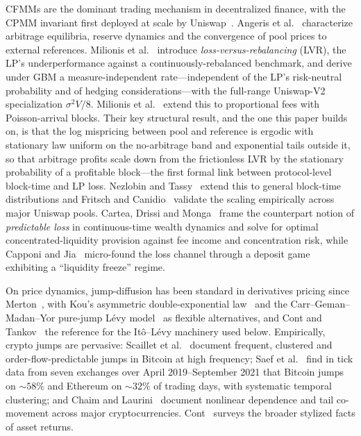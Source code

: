 \documentclass[runningheads]{llncs}
\newcommand{\1}{\mathbf{1}}
\begin{document}
CFMMs are the dominant trading mechanism in decentralized finance, with the CPMM invariant first deployed at scale by Uniswap~\cite{adams2021uniswap}. Angeris et al.~\cite{angeris2020improved} characterize arbitrage equilibria, reserve dynamics and the convergence of pool prices to external references. Milionis et al.~\cite{milionis2022automated} introduce \emph{loss-versus-rebalancing} (LVR), the LP's underperformance against a continuously-rebalanced benchmark, and derive under GBM a measure-independent rate---independent of the LP's risk-neutral probability and of hedging considerations---with the full-range Uniswap-V2 specialization $\sigma^2 V/8$. Milionis et al.~\cite{milionis2023automated} extend this to proportional fees with Poisson-arrival blocks. Their key structural result, and the one this paper builds on, is that the log mispricing between pool and reference is ergodic with stationary law uniform on the no-arbitrage band and exponential tails outside it, so that arbitrage profits scale down from the frictionless LVR by the stationary probability of a profitable block---the first formal link between protocol-level block-time and LP loss. Nezlobin and Tassy~\cite{nezlobin2025lvr} extend this to general block-time distributions and Fritsch and Canidio~\cite{fritsch2024measuring} validate the scaling empirically across major Uniswap pools. Cartea, Drissi and Monga~\cite{cartea2023predictable} frame the counterpart notion of \emph{predictable loss} in continuous-time wealth dynamics and solve for optimal concentrated-liquidity provision against fee income and concentration risk, while Capponi and Jia~\cite{capponi2024price} micro-found the loss channel through a deposit game exhibiting a ``liquidity freeze'' regime.

On price dynamics, jump-diffusion has been standard in derivatives pricing since Merton~\cite{merton1976option}, with Kou's asymmetric double-exponential law~\cite{kou2002jump} and the Carr--Geman--Madan--Yor pure-jump L\'evy model~\cite{carr2002fine} as flexible alternatives, and Cont and Tankov~\cite{cont2003financial} the reference for the It\^o--L\'evy machinery used below. Empirically, crypto jumps are pervasive: Scaillet et al.~\cite{scaillet2020high} document frequent, clustered and order-flow-predictable jumps in Bitcoin at high frequency; Saef et al.~\cite{saef2024temporal} find in tick data from seven exchanges over April 2019--September 2021 that Bitcoin jumps on $\sim$$58\%$ and Ethereum on $\sim$$32\%$ of trading days, with systematic temporal clustering; and Chaim and Laurini~\cite{chaim2019nonlinear} document nonlinear dependence and tail co-movement across major cryptocurrencies. Cont~\cite{cont2001empirical} surveys the broader stylized facts of asset returns.
\end{document}
